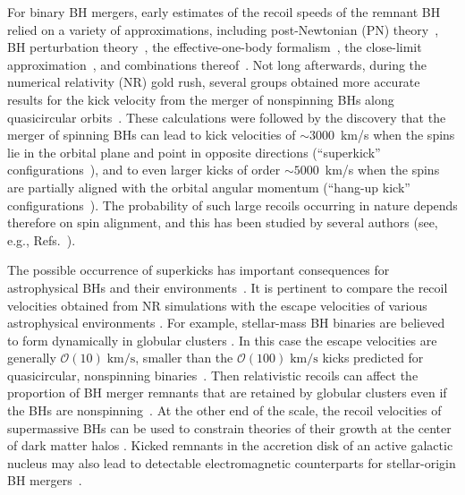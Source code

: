 \documentclass[floats,floatfix,showpacs,amssymb,physrev,twocolumn,superscriptaddress,reprint,
nofootinbib, longbibliography]{revtex4-2}
\newcounter{count}
\begin{document}
For binary BH mergers, early estimates of the recoil speeds of the
remnant BH relied on a variety of approximations, including
post-Newtonian (PN) theory~\cite{Fitchett1983-xq,Blanchet:2005rj}, BH
perturbation theory~\cite{Hughes:2004ck}, the effective-one-body
formalism~\cite{Damour:2006tr}, the close-limit
approximation~\cite{Sopuerta:2006wj,Sopuerta:2006et}, and combinations
thereof~\cite{LeTiec:2009yg}. Not long afterwards, during the
numerical relativity (NR) gold rush, several groups obtained more
accurate results for the kick velocity from the merger of nonspinning
BHs along
quasicircular
orbits~\cite{Baker:2006vn,Gonzalez:2006md,Herrmann:2007cwl}.
These calculations were followed by the discovery that the merger of
spinning BHs can lead to kick velocities of $\sim 3000$~km/s when the
spins lie in the orbital plane and point in opposite directions
(``superkick''
configurations~\cite{Gonzalez:2007hi,Campanelli:2007cga,Campanelli:2007ew}),
and to even larger kicks of order $\sim 5000$~km/s when the spins are
partially aligned with the orbital angular momentum (``hang-up kick''
configurations~\cite{Lousto:2011kp}). 
The probability of such large
recoils occurring in nature depends therefore on spin alignment, and
this has been studied by several authors (see, e.g.,
Refs.~\cite{Schnittman:2007sn,Dotti:2009vz,Kesden:2010ji,Lousto:2012su,Berti:2012zp,Lousto:2012su}).

The possible occurrence of superkicks has important consequences for
astrophysical BHs and their
environments~\cite{Komossa:2012cy,Colpi:2014poa,Blecha:2015baa,Barack:2018yly}.
It is pertinent to compare the recoil velocities obtained from NR
simulations with the escape velocities of various astrophysical
environments \cite{Merritt:2004xa}. For example, stellar-mass BH
binaries are believed to form dynamically in globular clusters
\cite{Benacquista:2011kv}. In this case the escape velocities are
generally $\mathcal{O}(10)\;\mathrm{km/s}$, smaller than the
$\mathcal{O}(100)\;\mathrm{km/s}$ kicks predicted for quasicircular,
nonspinning binaries~\cite{Gonzalez:2006md}. Then relativistic recoils
can affect the proportion of BH merger remnants that are retained by
globular clusters even if the BHs are
nonspinning~\cite{Morawski:2018kfs}. At the other end of the scale,
the recoil velocities of supermassive BHs can be used to constrain
theories of their growth at the center of dark matter halos
\cite{Haiman:2004ve}. Kicked remnants in the accretion disk of an
active galactic nucleus may also lead to detectable electromagnetic
counterparts for stellar-origin BH
mergers~\cite{Graham:2020gwr,Chen:2020gek}.
\end{document}

